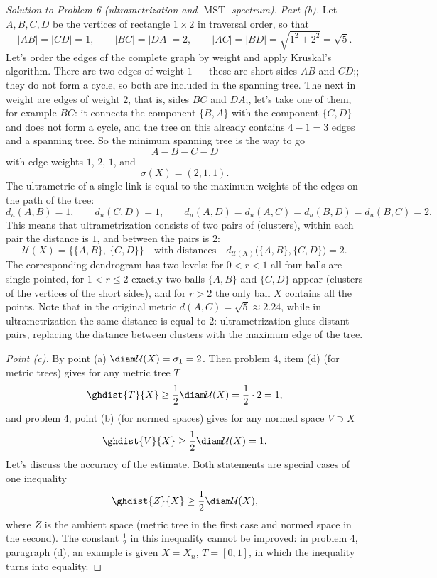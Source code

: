 \documentclass[a4paper,12pt]{report}
\begin{document}
\begin{proof}[Solution to Problem \textup{6} \textup{(}ultrametrization and $\operatorname{MST}$-spectrum\textup{)}]
\textit{Part \textup{(b)}.} Let $A,B,C,D$ be the vertices of rectangle $1\times2$ in traversal order, so that
\[
|AB|=|CD|=1,\qquad |BC|=|DA|=2,\qquad |AC|=|BD|=\sqrt{1^2+2^2}=\sqrt5 .
\]
Let's order the edges of the complete graph by weight and apply Kruskal's algorithm. There are two edges of weight $1$ --- these are short sides $AB$ and $CD$\textup{;}; they do not form a cycle, so both are included in the spanning tree. The next in weight are edges of weight $2$, that is, sides $BC$ and $DA$\textup{;}, let's take one of them, for example $BC$\textup{:} it connects the component $\{B,A\}$ with the component $\{C,D\}$ and does not form a cycle, and the tree on this already contains $4-1=3$ edges and a spanning tree. So the minimum spanning tree is the way to go
\[
A-B-C-D
\]
with edge weights $1$, $2$, $1$, and
\[
\sigma(X)=(2,1,1).
\]
The ultrametric of a single link is equal to the maximum weights of the edges on the path of the tree\textup{:}
\[
d_u(A,B)=1,\qquad d_u(C,D)=1,\qquad d_u(A,D)=d_u(A,C)=d_u(B,D)=d_u(B,C)=2 .
\]
This means that ultrametrization consists of two pairs of \textup{(}clusters\textup{)}, within each pair the distance is $1$, and between the pairs is $2$\textup{:}
\[
\mathcal U(X)=\bigl\{\{A,B\},\ \{C,D\}\bigr\}
\quad\text{with distances}\quad
d_{\mathcal U(X)}\bigl(\{A,B\},\{C,D\}\bigr)=2 .
\]
The corresponding dendrogram has two levels\textup{:} for $0<r<1$ all four balls are single-pointed, for $1<r\le2$ exactly two balls $\{A,B\}$ and $\{C,D\}$ appear \textup{(}clusters of the vertices of the short sides\textup{)}, and for $r>2$ the only ball $X$ contains all the points. Note that in the original metric $d(A,C)=\sqrt5\approx2.24$, while in ultrametrization the same distance is equal to $2$\textup{:} ultrametrization glues distant pairs, replacing the distance between clusters with the maximum edge of the tree.

\textit{Point \textup{(c)}.} By point \textup{(a)} $\diam\mathcal U(X)=\sigma_1=2$. Then problem \textup{4}, item \textup{(d)} \textup{(}for metric trees\textup{)} gives for any metric tree $T$
\[
\ghdist{T}{X}\ge\frac12\diam\mathcal U(X)=\frac12\cdot2=1 ,
\]
and problem \textup{4}, point \textup{(b)} \textup{(}for normed spaces\textup{)} gives for any normed space $V\supset X$
\[
\ghdist{V}{X}\ge\frac12\diam\mathcal U(X)=1 .
\]
Let's discuss the accuracy of the estimate. Both statements are special cases of one inequality
\[
\ghdist{Z}{X}\ge\frac12\diam\mathcal U(X),
\]
where $Z$ is the ambient space \textup{(}metric tree in the first case and normed space in the second\textup{)}. The constant $\frac12$ in this inequality cannot be improved\textup{:} in problem \textup{4}, paragraph \textup{(d)}, an example is given $X=X_n$, $T=[0,1]$, in which the inequality turns into equality.

\end{proof}
\end{document}
